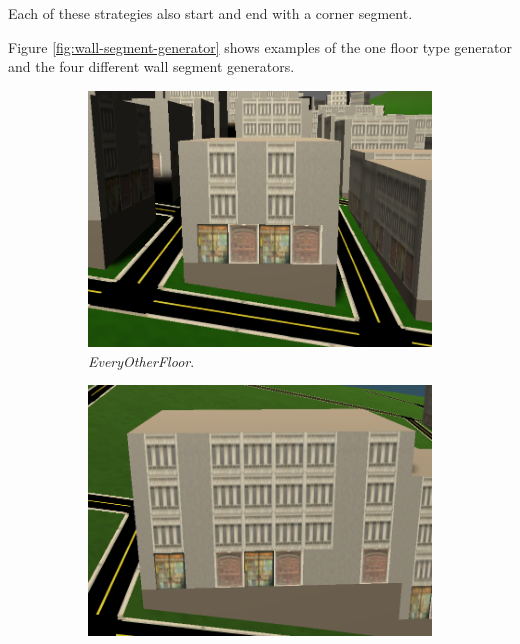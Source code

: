 Each of these strategies also start and end with a corner segment. 

Figure \ref{fig:wall-segment-generator} shows examples of the one floor type generator and the four different wall segment generators.

\begin{figure}[H]
  \centering

  \begin{subfigure}[b]{0.3\textwidth}
    \includegraphics[width=\textwidth]{figure/building-every-other.PNG}
    \caption{\textit{EveryOtherFloor}.}
  \end{subfigure}
  \quad
  \begin{subfigure}[b]{0.3\textwidth}
    \includegraphics[width=\textwidth]{figure/building-normal.PNG}

\end{subfigure}
\end{figure}
